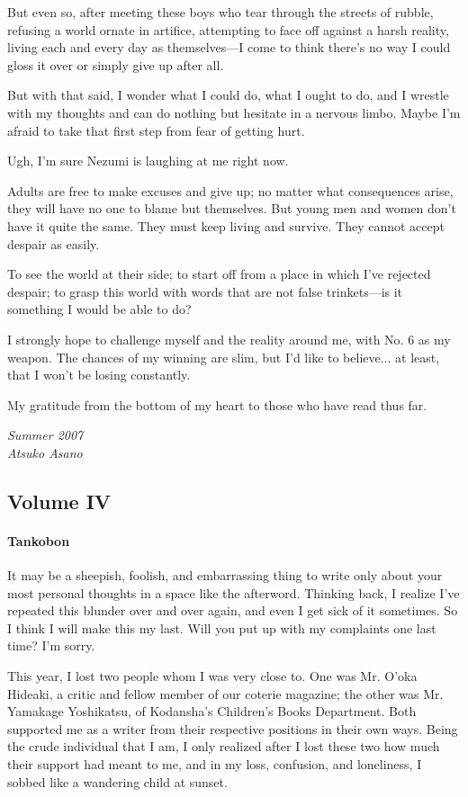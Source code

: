 But even so, after meeting these boys who tear through the streets of
rubble, refusing a world ornate in artifice, attempting to face off
against a harsh reality, living each and every day as themselves---I come
to think there's no way I could gloss it over or simply give up after
all.

But with that said, I wonder what I could do, what I ought to do, and I
wrestle with my thoughts and can do nothing but hesitate in a nervous
limbo. Maybe I'm afraid to take that first step from fear of getting
hurt.

Ugh, I'm sure Nezumi is laughing at me right now.

Adults are free to make excuses and give up; no matter what consequences
arise, they will have no one to blame but themselves. But young men and
women don't have it quite the same. They must keep living and survive.
They cannot accept despair as easily.

To see the world at their side; to start off from a place in which I've
rejected despair; to grasp this world with words that are not false
trinkets---is it something I would be able to do?

I strongly hope to challenge myself and the reality around me, with No.
6 as my weapon. The chances of my winning are slim, but I'd like to
believe... at least, that I won't be losing constantly.

My gratitude from the bottom of my heart to those who have read thus
far.

\myspace

\emph{Summer 2007\\
	Atsuko Asano}

\subsection{Volume IV}
\paragraph{Tankobon}

It may be a sheepish, foolish, and embarrassing thing to write only
about your most personal thoughts in a space like the afterword.
Thinking back, I realize I've repeated this blunder over and over again,
and even I get sick of it sometimes. So I think I will make this my
last. Will you put up with my complaints one last time? I'm sorry.

This year, I lost two people whom I was very close to. One was Mr. O'oka
Hideaki, a critic and fellow member of our coterie magazine; the other
was Mr. Yamakage Yoshikatsu, of Kodansha's Children's Books Department.
Both supported me as a writer from their respective positions in their
own ways. Being the crude individual that I am, I only realized after I
lost these two how much their support had meant to me, and in my loss,
confusion, and loneliness, I sobbed like a wandering child at sunset.

